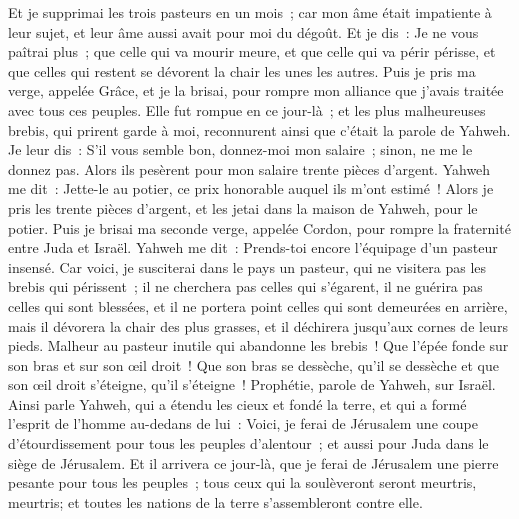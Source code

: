 \begin{multicols}{2}
Et je supprimai les trois pasteurs en un mois~; car mon âme était impatiente à leur sujet, et leur âme aussi avait pour moi du dégoût.
Et je dis~: Je ne vous paîtrai plus~; que celle qui va mourir meure, et que celle qui va périr périsse, et que celles qui restent se dévorent la chair les unes les autres.
Puis je pris ma verge, appelée Grâce, et je la brisai, pour rompre mon alliance que j'avais traitée avec tous ces peuples.
Elle fut rompue en ce jour-là~; et les plus malheureuses brebis, qui prirent garde à moi, reconnurent ainsi que c'était la parole de Yahweh.
Je leur dis~: S'il vous semble bon, donnez-moi mon salaire~; sinon, ne me le donnez pas. Alors ils pesèrent pour mon salaire trente pièces d'argent.
Yahweh me dit~: Jette-le au potier, ce prix honorable auquel ils m'ont estimé~! Alors je pris les trente pièces d'argent, et les jetai dans la maison de Yahweh, pour le potier.
Puis je brisai ma seconde verge, appelée Cordon, pour rompre la fraternité entre Juda et Israël.
Yahweh me dit~: Prends-toi encore l'équipage d'un pasteur insensé.
Car voici, je susciterai dans le pays un pasteur, qui ne visitera pas les brebis qui périssent~; il ne cherchera pas celles qui s'égarent, il ne guérira pas celles qui sont blessées, et il ne portera point celles qui sont demeurées en arrière, mais il dévorera la chair des plus grasses, et il déchirera jusqu'aux cornes de leurs pieds.
Malheur au pasteur inutile qui abandonne les brebis~! Que l'épée fonde sur son bras et sur son œil droit~! Que son bras se dessèche, qu'il se dessèche et que son œil droit s'éteigne, qu'il s'éteigne~!
\VerseOne{}Prophétie, parole de Yahweh, sur Israël. Ainsi parle Yahweh, qui a étendu les cieux et fondé la terre, et qui a formé l'esprit de l'homme au-dedans de lui~:
Voici, je ferai de Jérusalem une coupe d'étourdissement pour tous les peuples d'alentour~; et aussi pour Juda dans le siège de Jérusalem.
Et il arrivera ce jour-là, que je ferai de Jérusalem une pierre pesante pour tous les peuples~; tous ceux qui la soulèveront seront meurtris, meurtris; et toutes les nations de la terre s'assembleront contre elle.

\end{multicols}

